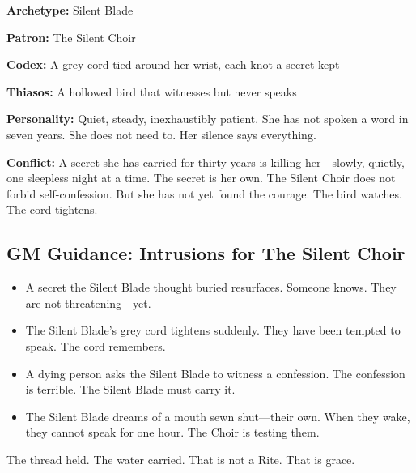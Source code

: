 \textbf{Archetype:} Silent Blade

\textbf{Patron:} The Silent Choir

\textbf{Codex:} A grey cord tied around her wrist, each knot a secret kept

\textbf{Thiasos:} A hollowed bird that witnesses but never speaks

\textbf{Personality:} Quiet, steady, inexhaustibly patient. She has not spoken a word in seven years. She does not need to. Her silence says everything.

\textbf{Conflict:} A secret she has carried for thirty years is killing her—slowly, quietly, one sleepless night at a time. The secret is her own. The Silent Choir does not forbid self-confession. But she has not yet found the courage. The bird watches. The cord tightens.

\subsection{GM Guidance: Intrusions for The Silent Choir}

\begin{itemize}
\item A secret the Silent Blade thought buried resurfaces. Someone knows. They are not threatening—yet.
\item The Silent Blade's grey cord tightens suddenly. They have been tempted to speak. The cord remembers.
\item A dying person asks the Silent Blade to witness a confession. The confession is terrible. The Silent Blade must carry it.
\item The Silent Blade dreams of a mouth sewn shut—their own. When they wake, they cannot speak for one hour. The Choir is testing them.
\end{itemize}

The thread held. The water carried. That is not a Rite. That is grace.
